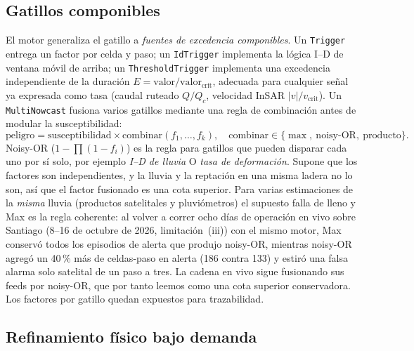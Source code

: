 \documentclass[authoryear,preprint,review,12pt]{elsarticle}
\begin{document}
\subsection{Gatillos componibles}

El motor generaliza el gatillo a \emph{fuentes de excedencia componibles}. Un
\texttt{Trigger} entrega un factor por celda y paso; un \texttt{IdTrigger}
implementa la lógica I--D de ventana móvil de arriba; un
\texttt{ThresholdTrigger} implementa una excedencia independiente de la duración
$E=\mathrm{valor}/\mathrm{valor_{crit}}$, adecuada para cualquier señal ya
expresada como tasa (caudal ruteado $Q/Q_c$, velocidad InSAR
$|v|/v_{\mathrm{crit}}$). Un \texttt{MultiNowcast} fusiona varios gatillos
mediante una regla de combinación antes de modular la susceptibilidad:
\begin{equation}
\mathrm{peligro}=\mathrm{susceptibilidad}\times\mathrm{combinar}(f_1,\ldots,f_k),
\quad\mathrm{combinar}\in\{\max,\ \mathrm{noisy\text{-}OR},\ \mathrm{producto}\}.
\label{eq:multi}
\end{equation}
Noisy-OR ($1-\prod(1-f_i)$) es la regla para gatillos que pueden disparar cada uno
por sí solo, por ejemplo \emph{I--D de lluvia} O \emph{tasa de deformación}. Supone
que los factores son independientes, y la lluvia y la reptación en una misma ladera
no lo son, así que el factor fusionado es una cota superior. Para varias estimaciones
de la \emph{misma} lluvia (productos satelitales y pluviómetros) el supuesto falla de
lleno y Max es la regla coherente: al volver a correr ocho días de operación en vivo
sobre Santiago (8--16 de octubre de 2026, limitación~(iii)) con el mismo motor, Max
conservó todos los episodios de alerta que produjo noisy-OR, mientras noisy-OR agregó
un 40\,\% más de celdas-paso en alerta (186 contra 133) y estiró una falsa alarma solo
satelital de un paso a tres. La cadena en vivo sigue fusionando sus feeds por
noisy-OR, que por tanto leemos como una cota superior conservadora. Los factores por
gatillo quedan expuestos para trazabilidad.

\subsection{Refinamiento físico bajo demanda}
\end{document}
